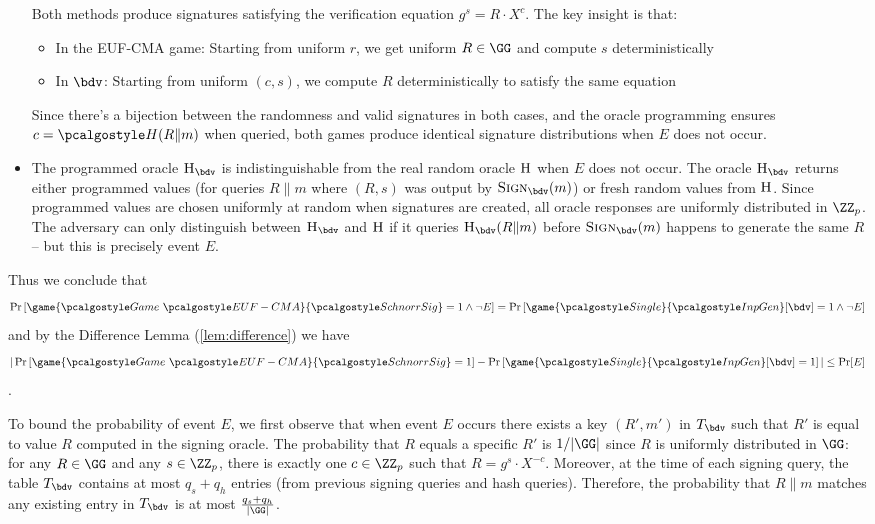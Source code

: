 \begin{mysolution}
\begin{itemize}
    Both methods produce signatures satisfying the verification equation $g^s = R \cdot X^c$. The key insight is that:
    \begin{itemize}
      \item In the EUF-CMA game: Starting from uniform $r$, we get uniform $R \in \GG$ and compute $s$ deterministically
      \item In $\bdv$: Starting from uniform $(c, s)$, we compute $R$ deterministically to satisfy the same equation
    \end{itemize}

    Since there's a bijection between the randomness and valid signatures in both cases, and the oracle programming ensures $c = \algo{H}(R \| m)$ when
  queried, both games produce identical signature distributions when $E$ does not occur.
  \item The programmed oracle $\pcoracle{H}_{\bdv}$ is indistinguishable from the real random oracle ${\normalfont\textsc{H}}$ when $E$ does not occur. The oracle
  $\pcoracle{H}_{\bdv}$ returns either programmed values (for queries $R \| m$ where $(R, s)$ was output by $\pcoracle{Sign}_{\bdv}(m)$) or fresh random
  values from ${\normalfont\textsc{H}}$. Since programmed values are chosen uniformly at random when signatures are created, all oracle responses are uniformly
  distributed in $\ZZ_p$. The adversary can only distinguish between $\pcoracle{H}_{\bdv}$ and ${\normalfont\textsc{H}}$ if it queries $\pcoracle{H}_{\bdv}(R \| m)$
  before $\pcoracle{Sign}_{\bdv}(m)$ happens to generate the same $R$ – but this is precisely event $E$.
  \end{itemize}

  Thus we conclude that
  \[
    \pr{\game{\Game~\algo{EUF-CMA}}{\algo{SchnorrSig}} = 1 \wedge \neg E} =  \pr{\game{\algo{Single}}{\algo{InpGen}}[\bdv] = 1 \wedge \neg E}
  \] and by the Difference Lemma (\autoref{lem:difference}) we have
  \[
    |\pr{\game{\Game~\algo{EUF-CMA}}{\algo{SchnorrSig}} = 1} - \pr{\game{\algo{Single}}{\algo{InpGen}}[\bdv] = 1}| \leq \Pr[E]
  \].

  To bound the probability of event $E$, we first observe that when event $E$ occurs there exists a key $(R', m')$ in $T_{\bdv}$ such that $R'$ is equal to value $R$ computed in the signing oracle.
  The probability that $R$ equals a specific $R'$ is $1/|\GG|$ since $R$ is uniformly distributed in $\GG$: for any $R \in \GG$ and any $s \in \ZZ_p$, there is exactly one $c \in \ZZ_p$ such that $R = g^s \cdot X^{-c}$.
  Moreover, at the time of each signing query, the table $T_{\bdv}$ contains at most $q_s + q_h$ entries (from previous signing queries and hash queries).
  Therefore, the probability that $R \| m$ matches any existing entry in $T_{\bdv}$ is at most $\frac{q_s + q_h}{|\GG|}$.


\end{mysolution}
